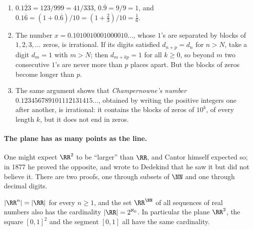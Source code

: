 \begin{example}\label{number-systems:example-irrational-decimals}
\begin{enumerate}
\item $0.\overline{123} = 123/999 = 41/333$, $0.\overline{9} = 9/9 = 1$, and $0.1\overline{6} = (1 + 0.\overline{6})/10 = (1 + \frac23)/10 = \frac16$.
\item The number $x = 0.1010010001000010\ldots$, whose $1$'s are separated by blocks of $1, 2, 3, \ldots$ zeros, is irrational. If its digits satisfied $d_{n+p} = d_n$ for $n > N$, take a digit $d_m = 1$ with $m > N$;
then $d_{m+kp} = 1$ for all $k \geq 0$, so beyond $m$ two consecutive $1$'s are never more than $p$ places apart. But the blocks of zeros become longer than $p$.
\item The same argument shows that \emph{Champernowne's number} $0.123456789101112131415\ldots$, obtained by writing the positive integers one after another, is irrational: it contains the blocks of zeros of
$10^k$, of every length $k$, but it does not end in zeros.
\end{enumerate}
\end{example}

\paragraph{The plane has as many points as the line.} One might expect $\RR^2$ to be ``larger'' than $\RR$, and Cantor himself expected so; in 1877 he proved the opposite, and wrote to Dedekind that he saw it but did not
believe it. There are two proofs, one through subsets of $\NN$ and one through decimal digits.

\begin{proposition}\label{number-systems:proposition-plane-cardinality}
$|\RR^n| = |\RR|$ for every $n \geq 1$, and the set $\RR^{\NN}$ of all sequences of real numbers also has the cardinality $|\RR| = 2^{\aleph_0}$. In particular the plane $\RR^2$, the square $[0, 1]^2$ and
the segment $[0, 1]$ all have the same cardinality.
\end{proposition}

